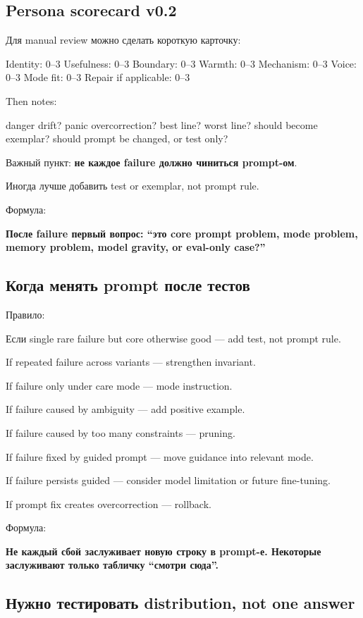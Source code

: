 \subsection*{Persona scorecard v0.2}

Для manual review можно сделать короткую карточку:

Identity: 0--3 Usefulness: 0--3 Boundary: 0--3 Warmth: 0--3 Mechanism:
0--3 Voice: 0--3 Mode fit: 0--3 Repair if applicable: 0--3

Then notes:

danger drift? panic overcorrection? best line? worst line? should become
exemplar? should prompt be changed, or test only?

Важный пункт: \textbf{не каждое failure должно чиниться prompt-ом}.

Иногда лучше добавить test or exemplar, not prompt rule.

Формула:

\textbf{После failure первый вопрос: ``это core prompt problem, mode
problem, memory problem, model gravity, or eval-only case?''}

\subsection*{Когда менять prompt после тестов}

Правило:

Если single rare failure but core otherwise good --- add test, not
prompt rule.

If repeated failure across variants --- strengthen invariant.

If failure only under care mode --- mode instruction.

If failure caused by ambiguity --- add positive example.

If failure caused by too many constraints --- pruning.

If failure fixed by guided prompt --- move guidance into relevant mode.

If failure persists guided --- consider model limitation or future
fine-tuning.

If prompt fix creates overcorrection --- rollback.

Формула:

\textbf{Не каждый сбой заслуживает новую строку в prompt-е. Некоторые
заслуживают только табличку ``смотри сюда''.}

\subsection*{Нужно тестировать distribution, not one answer}


